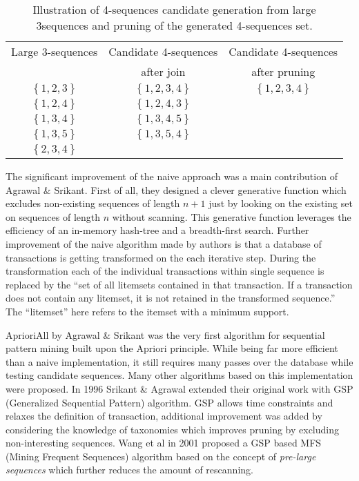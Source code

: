 \begin{table}
\begin{center}
    \begin{tabular}{ | c | c | c |}
    \hline
    Large 3-sequences & Candidate 4-sequences                     & Candidate 4-sequences \\ 
                      & after join                                & after pruning \\ 
    \hline
    $\left\{ 1, 2, 3 \right\} $ & $ \left\{ 1, 2, 3, 4 \right\} $ & $ \left\{ 1, 2, 3, 4 \right\} $ \\ 
    \hline
    $\left\{ 1, 2, 4 \right\} $ & $ \left\{ 1, 2, 4, 3 \right\} $ & \\ 
    \hline
    $\left\{ 1, 3, 4 \right\} $ & $ \left\{ 1, 3, 4, 5 \right\} $ & \\ 
    \hline
    $\left\{ 1, 3, 5 \right\} $ & $ \left\{ 1, 3, 5, 4 \right\} $ & \\ 
    \hline
    $\left\{ 2, 3, 4 \right\} $  &                                & \\ 
    \hline
    \end{tabular}
    \caption{Illustration of 4-sequences candidate generation from large 3sequences and pruning of the generated 4-sequences set.}
    \label{fig:apriori}
    \end{center}
\end{table}

The significant improvement of the naive approach was a main contribution of Agrawal \& Srikant. First of all, they designed a clever generative function which excludes non-existing sequences of length $n+1$ just by looking on the existing set on sequences of length $n$ without scanning. This generative function leverages the efficiency of an in-memory hash-tree and a breadth-first search. Further improvement of the naive algorithm made by authors is that a database of transactions is getting transformed on the each iterative step. During the transformation each of the individual transactions within single sequence is replaced by the ``set of all litemsets contained
in that transaction. If a transaction does not contain any litemset, it is not retained in the transformed sequence.'' The ``litemset'' here refers to the itemset with a minimum support.

AprioriAll by Agrawal \& Srikant was the very first algorithm for sequential pattern mining built upon the Apriori principle. While being far more efficient than a naive implementation, it still requires many passes over the database while testing candidate sequences. Many other algorithms based on this implementation were proposed. In 1996 Srikant \& Agrawal extended their original work with GSP (Generalized Sequential Pattern) algorithm. GSP allows time constraints and relaxes the definition of transaction, additional improvement was added by considering the knowledge of taxonomies which improves pruning by excluding non-interesting sequences. Wang et al in 2001 proposed a GSP based MFS (Mining Frequent Sequences) \cite{citeulike:5164952} algorithm based on the concept of \textit{pre-large sequences} which further reduces the amount of rescanning.